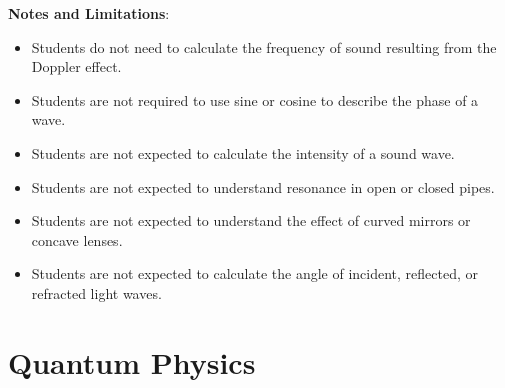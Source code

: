 \documentclass[dvipsnames]{article}
\begin{document}
\textbf{Notes and Limitations}:
\begin{itemize}[topsep=-3pt,itemsep=0pt]
    \item Students do not need to calculate the frequency of sound resulting from the Doppler effect.
    \item Students are not required to use sine or cosine to describe the phase of a wave.
    \item Students are not expected to calculate the intensity of a sound wave.
    \item Students are not expected to understand resonance in open or closed pipes.
    \item Students are not expected to understand the effect of curved mirrors or concave lenses.
    \item Students are not expected to calculate the angle of incident, reflected, or refracted light waves.
\end{itemize}

 



\section{Quantum Physics}
\end{document}
